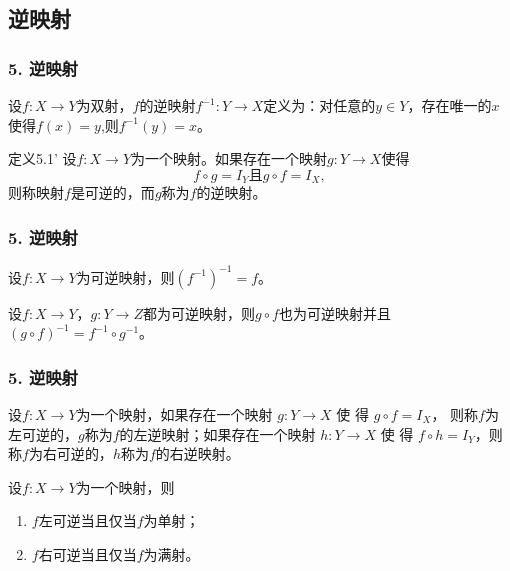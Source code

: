 \documentclass{beamer}
\begin{document}
\begin{CJK*}{UTF8}{gbsn}
\section{逆映射}
\begin{frame}
  \frametitle{5. 逆映射}
  \begin{Def}
     设$f:X\to Y$为双射，$f$的\alert{逆映射}$f^{-1}:Y\to X$定义为：对任意的$y\in Y$，存在唯一的$x$使得$f(x)=y$,则$f^{-1}(y)=x$。
   \end{Def}
   \pause
     \begin{block}{定义5.1'}
     设$f:X\to Y$为一个映射。如果存在一个映射$g:Y\to X$使得\[f\circ g = I_{Y} \text{且} g\circ f = I_{X},\]则称映射$f$是可逆的，而$g$称为$f$的\alert{逆映射}。
  \end{block}
\end{frame}
\begin{frame}
  \frametitle{5. 逆映射}
  \begin{Thm}
    设$f:X\to Y$为可逆映射，则$(f^{-1})^{-1}=f$。
  \end{Thm}
  \pause
  \begin{Thm}
    设$f:X\to Y$，$g:Y\to Z$都为可逆映射，则$g\circ f$也为可逆映射并且$(g\circ f)^{-1} = f^{-1}\circ g^{-1}$。
  \end{Thm}
\end{frame}
\begin{frame}
  \frametitle{5. 逆映射}
  \begin{Def}\justifying\let\raggedright\justifying
    设$f:X\to Y$为一个映射，如果存在一个映射 $g:Y\to X$ 使 得 $g\circ f = I_X$，
    则称$f$为\alert{左可逆}的，$g$称为$f$的\alert{左逆映射}；如果存在一个映射
    $h:Y\to X$ 使 得 $f\circ h=I_Y$，则称$f$为\alert{右可逆}的，$h$称为$f$的\alert{右逆映射}。
  \end{Def}\pause
  \begin{Thm}
    设$f:X\to Y$为一个映射，则
    \begin{enumerate}
    \item $f$左可逆当且仅当$f$为单射；
    \item $f$右可逆当且仅当$f$为满射。
    \end{enumerate}
  \end{Thm}
\end{frame}

\end{CJK*}
\end{document}
